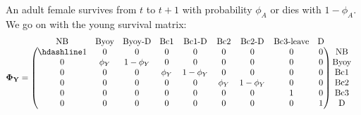 \documentclass[
  12pt,
]{krantz}
\begin{document}
An adult female survives from \(t\) to \(t+1\) with probability \(\phi_A\) or dies with \(1−\phi_A\). We go on with the young survival matrix:
\[
\begin{matrix}
& \\
\mathbf{\Phi_Y} =
\left ( \vphantom{ \begin{matrix} 12 \\ 12 \\ 12 \\ 12 \\ 12 \\ 12 \end{matrix} } \right .
\end{matrix}
\hspace{-1.2em}
\begin{matrix}
\text{NB} & \text{Byoy} & \text{Byoy-D} & \text{Bc1} & \text{Bc1-D} & \text{Bc2} & \text{Bc2-D} & \text{Bc3-leave} & \text{D} \\ \hdashline
1 & 0 & 0 & 0 & 0 & 0 & 0 & 0 & 0 \\
0 & \phi_{Y} & 1 - \phi_{Y} & 0 & 0 & 0 & 0 & 0 & 0 \\
0 & 0 & 0 & \phi_{Y} & 1 - \phi_{Y} & 0 & 0 & 0 & 0 \\
0 & 0 & 0 & 0 & 0 & \phi_{Y} & 1 - \phi_{Y} & 0 & 0 \\
0 & 0 & 0 & 0 & 0 & 0 & 0 & 1 & 0 \\
0 & 0 & 0 & 0 & 0 & 0 & 0 & 0 & 1
\end{matrix}
\hspace{-0.2em}
\begin{matrix}
& \\
\left . \vphantom{ \begin{matrix} 12 \\ 12 \\ 12 \\ 12 \\ 12 \\ 12 \end{matrix} } \right )
\begin{matrix}
\text{NB} \\
\text{Byoy} \\
\text{Bc1} \\
\text{Bc2} \\
\text{Bc3} \\
\text{D}
\end{matrix}
\end{matrix}
\]
\end{document}
